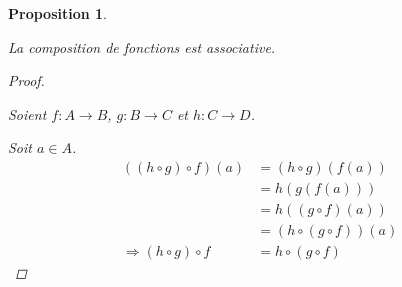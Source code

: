 \documentclass{report}
\newtheorem*{prop}{Proposition}
\theoremstyle{definition}
\theoremstyle{remark}
\begin{document}
	\begin{prop}
		~

		La composition de fonctions est associative.
		\begin{proof}~

			Soient $f:A \to B$, $g:B \to C$ et $h:C \to D$.

			Soit $a \in A$.
			\begin{align*}
				((h \circ g) \circ f)(a)&= (h \circ g)(f(a))\\
				&= h(g(f(a)))\\
				&= h((g \circ f)(a))\\
				&= (h \circ (g \circ f))(a)\\
				\Rightarrow (h \circ g) \circ f&= h \circ (g \circ f)
			\end{align*}
		\end{proof}
	\end{prop}
\end{document}
